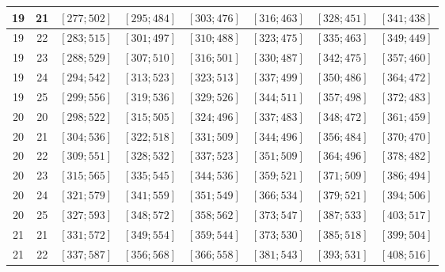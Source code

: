 \documentclass[a4paper,12pt]{article}
\begin{document}
\begin{center}
{\begin{longtable}[H]{|c|c|c|c|c|c|c|c|}
19 &  21 &  $\left[ 277; 502\right]$ &  $\left[ 295; 484\right]$ &  $\left[ 303; 476\right]$ &  $\left[ 316; 463\right]$ &  $\left[ 328; 451\right]$ &  $\left[ 341; 438\right]$ \tabularnewline \hline
19 &  22 &  $\left[ 283; 515\right]$ &  $\left[ 301; 497\right]$ &  $\left[ 310; 488\right]$ &  $\left[ 323; 475\right]$ &  $\left[ 335; 463\right]$ &  $\left[ 349; 449\right]$ \tabularnewline \hline
19 &  23 &  $\left[ 288; 529\right]$ &  $\left[ 307; 510\right]$ &  $\left[ 316; 501\right]$ &  $\left[ 330; 487\right]$ &  $\left[ 342; 475\right]$ &  $\left[ 357; 460\right]$ \tabularnewline \hline
19 &  24 &  $\left[ 294; 542\right]$ &  $\left[ 313; 523\right]$ &  $\left[ 323; 513\right]$ &  $\left[ 337; 499\right]$ &  $\left[ 350; 486\right]$ &  $\left[ 364; 472\right]$ \tabularnewline \hline
19 &  25 &  $\left[ 299; 556\right]$ &  $\left[ 319; 536\right]$ &  $\left[ 329; 526\right]$ &  $\left[ 344; 511\right]$ &  $\left[ 357; 498\right]$ &  $\left[ 372; 483\right]$ \tabularnewline \hline
20 &  20 &  $\left[ 298; 522\right]$ &  $\left[ 315; 505\right]$ &  $\left[ 324; 496\right]$ &  $\left[ 337; 483\right]$ &  $\left[ 348; 472\right]$ &  $\left[ 361; 459\right]$ \tabularnewline \hline
20 &  21 &  $\left[ 304; 536\right]$ &  $\left[ 322; 518\right]$ &  $\left[ 331; 509\right]$ &  $\left[ 344; 496\right]$ &  $\left[ 356; 484\right]$ &  $\left[ 370; 470\right]$ \tabularnewline \hline
20 &  22 &  $\left[ 309; 551\right]$ &  $\left[ 328; 532\right]$ &  $\left[ 337; 523\right]$ &  $\left[ 351; 509\right]$ &  $\left[ 364; 496\right]$ &  $\left[ 378; 482\right]$ \tabularnewline \hline
20 &  23 &  $\left[ 315; 565\right]$ &  $\left[ 335; 545\right]$ &  $\left[ 344; 536\right]$ &  $\left[ 359; 521\right]$ &  $\left[ 371; 509\right]$ &  $\left[ 386; 494\right]$ \tabularnewline \hline
20 &  24 &  $\left[ 321; 579\right]$ &  $\left[ 341; 559\right]$ &  $\left[ 351; 549\right]$ &  $\left[ 366; 534\right]$ &  $\left[ 379; 521\right]$ &  $\left[ 394; 506\right]$ \tabularnewline \hline
20 &  25 &  $\left[ 327; 593\right]$ &  $\left[ 348; 572\right]$ &  $\left[ 358; 562\right]$ &  $\left[ 373; 547\right]$ &  $\left[ 387; 533\right]$ &  $\left[ 403; 517\right]$ \tabularnewline \hline
21 &  21 &  $\left[ 331; 572\right]$ &  $\left[ 349; 554\right]$ &  $\left[ 359; 544\right]$ &  $\left[ 373; 530\right]$ &  $\left[ 385; 518\right]$ &  $\left[ 399; 504\right]$ \tabularnewline \hline
21 &  22 &  $\left[ 337; 587\right]$ &  $\left[ 356; 568\right]$ &  $\left[ 366; 558\right]$ &  $\left[ 381; 543\right]$ &  $\left[ 393; 531\right]$ &  $\left[ 408; 516\right]$ \tabularnewline \hline

\end{longtable}}
\end{center}
\end{document}
